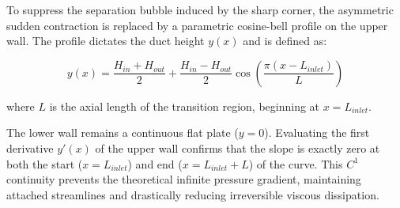 \documentclass[12pt, a4paper]{article}
\begin{document}
\noindent
\begin{minipage}{0.48\textwidth}
	To suppress the separation bubble induced by the sharp corner, the asymmetric sudden contraction is replaced by a parametric cosine-bell profile on the upper wall. The profile dictates the duct height $y(x)$ and is defined as:
	
	\begin{equation}
		y(x) = \frac{H_{in} + H_{out}}{2} + \frac{H_{in} - H_{out}}{2} \cos\left( \frac{\pi (x - L_{inlet})}{L} \right)
	\end{equation}
	
	where $L$ is the axial length of the transition region, beginning at $x = L_{inlet}$. 
	
	The lower wall remains a continuous flat plate ($y=0$). Evaluating the first derivative $y'(x)$ of the upper wall confirms that the slope is exactly zero at both the start ($x = L_{inlet}$) and end ($x = L_{inlet} + L$) of the curve. This $C^1$ continuity prevents the theoretical infinite pressure gradient, maintaining attached streamlines and drastically reducing irreversible viscous dissipation.
\end{minipage}
\hfill
\end{document}
